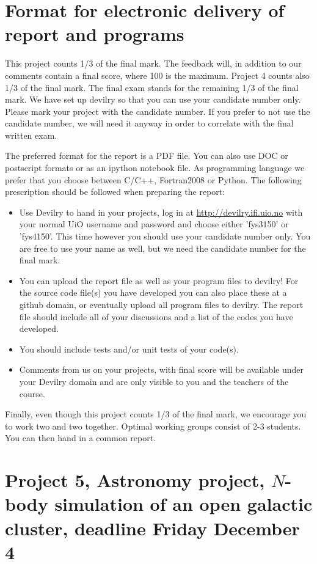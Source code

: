 \documentclass[11pt,a4wide]{article}
\begin{document}
\section*{Format for electronic delivery of report and programs}
%
This project counts 1/3 of the final mark. The feedback will, in addition to our comments contain a final score, where 100 is the maximum. Project 4 counts also 1/3 of the final mark. The final exam stands for the remaining 1/3 of the final mark.
We have set up devilry so that you can use your candidate number only. Please mark your project with the candidate number. If you prefer to not use the candidate number, we will need it anyway in order to correlate with the final written exam. 

The preferred format for the report is a PDF file. You can also
use DOC or postscript formats or as an ipython notebook file. 
As programming language we prefer that you choose between C/C++, Fortran2008 or Python.
The following prescription should be followed when preparing the report:
\begin{itemize}
\item Use Devilry to hand in your projects, log in  at 
\url{ http://devilry.ifi.uio.no} with your normal UiO username and password
and choose either 'fys3150' or 'fys4150'. This time however you should use your candidate number only. You are free to use your name as well, but we need the candidate number for the final mark. 
\item You can upload the report file as well as your program files to devilry!  For the source code file(s) you have developed you can also place these at  a github domain, or eventually upload all program files to devilry.  
The report file should include all of your discussions and a list of the codes you have developed. 
\item You should include tests and/or unit tests of your code(s).
\item Comments  from us on your projects, with final score
will be available under
your Devilry domain and are only visible to you and the teachers of the course.

\end{itemize}

Finally, even though this project counts 1/3 of the final mark, 
we encourage you to work two and two together. Optimal working groups consist of 
2-3 students. You can then hand in a common report. 


\section*{Project 5, Astronomy project, $N$-body simulation of an open galactic cluster, deadline  Friday December 4}
\end{document}
